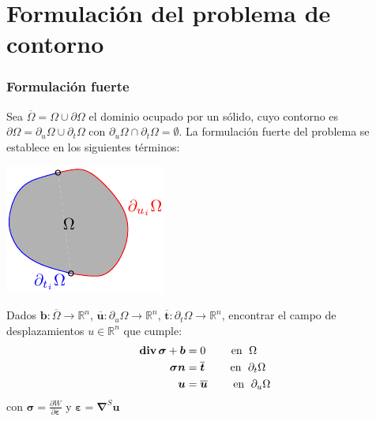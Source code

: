 \documentclass{beamer}
\newcommand{\diver}{\operatorname{{\bf div}}}
\begin{document}
\section{Formulación del problema de contorno}
\begin{frame}
\frametitle{Formulación fuerte}
\parbox{70mm}{
Sea $\overline{\Omega}=\Omega \cup \partial \Omega$ el dominio
ocupado por un sólido, cuyo contorno es $\partial \Omega=
\partial_u \Omega \cup \partial_t \Omega$ con
$\partial_u \Omega \cap \partial_t \Omega=\emptyset$. La
formulación fuerte del problema se establece en los siguientes términos:
}\parbox{60mm}{
\includegraphics{elas1}
}
Dados $\bm{b}:\overline{\Omega} \rightarrow \mathbb{R}^n$,
$\overline{\bm{u}}: \partial_u \Omega \rightarrow \mathbb{R}^n$,
$\overline{\bm{t}}: \partial_t \Omega \rightarrow \mathbb{R}^n$,
encontrar el campo de desplazamientos $u\in \mathbb{R}^n$ que cumple:
\begin{align}
\diver\bm{\sigma}+\bm{b}&=0  \qquad \textrm{ en }\;{\Omega} \label{eula11} \\
\bm{\sigma}\bm{n}&=\overline{\bm{t}} \qquad \textrm{ en }\;\partial_t \Omega \\
\bm{u}&=\overline{\bm{u}} \qquad \textrm{ en }\;\partial_u \Omega
\end{align}
con $\bm{\sigma}=\frac{\partial W}{\partial \bm \varepsilon}$ y
$\bm{\varepsilon}=\bm{\nabla}^{S}\bm{u}$
\end{frame}
\end{document}
